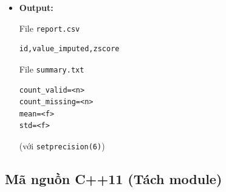 \begin{itemize}
\begin{itemize}
        \item \textbf{Module 2 (Tính thống kê):}

        \begin{itemize}
            \item Hàm \texttt{computeStats()}
            \item Tính:
            \begin{itemize}
                \item count\_valid
                \item count\_missing
                \item mean
                \item std
            \end{itemize}
            \item Bỏ qua các giá trị missing
            \item Dùng \texttt{long double} để giảm sai số
        \end{itemize}

        \item \textbf{Module 3 (Impute + Z-score):}

        \begin{itemize}
            \item Hàm \texttt{imputeAndScore()}
            \item Missing sẽ được thay bằng mean
            \item Công thức:
            \[
                z = \frac{x - mean}{std}
            \]
        \end{itemize}

    \end{itemize}

    \item \textbf{Output:}

    File \texttt{report.csv}

\begin{lstlisting}
id,value_imputed,zscore
\end{lstlisting}

    File \texttt{summary.txt}

\begin{lstlisting}
count_valid=<n>
count_missing=<n>
mean=<f>
std=<f>
\end{lstlisting}

(với \texttt{setprecision(6)})

\end{itemize}

\subsection{Mã nguồn C++11 (Tách module)}

